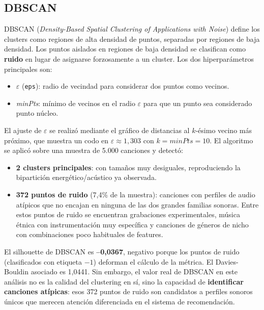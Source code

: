 \documentclass[12pt, a4paper]{book}
\theoremstyle{definition}
\begin{document}
\subsection{DBSCAN}
\label{sec:dbscan}

DBSCAN (\textit{Density-Based Spatial Clustering of Applications with Noise})
define los clusters como regiones de alta densidad de puntos, separadas por
regiones de baja densidad. Los puntos aislados en regiones de baja densidad
se clasifican como \textbf{ruido} en lugar de asignarse forzosamente a un
cluster. Los dos hiperparámetros principales son:

\begin{itemize}
  \item $\varepsilon$ (\texttt{eps}): radio de vecindad para considerar dos
        puntos como vecinos.
  \item \textit{minPts}: mínimo de vecinos en el radio $\varepsilon$ para
        que un punto sea considerado punto núcleo.
\end{itemize}

El ajuste de $\varepsilon$ se realizó mediante el gráfico de distancias al
$k$-ésimo vecino más próximo, que muestra un codo en $\varepsilon \approx 1{,}303$
con $k = \textit{minPts} = 10$. El algoritmo se aplicó sobre una muestra de
5.000 canciones y detectó:
\begin{itemize}
  \item \textbf{2 clusters principales}: con tamaños muy desiguales,
        reproduciendo la bipartición energético/acústico ya observada.
  \item \textbf{372 puntos de ruido} (7{,}4\% de la muestra): canciones con
        perfiles de audio atípicos que no encajan en ninguna de las dos
        grandes familias sonoras. Entre estos puntos de ruido se encuentran
        grabaciones experimentales, música étnica con instrumentación muy
        específica y canciones de géneros de nicho con combinaciones poco
        habituales de features.
\end{itemize}

El silhouette de DBSCAN es \textbf{--0{,}0367}, negativo porque los puntos
de ruido (clasificados con etiqueta $-1$) deforman el cálculo de la métrica.
El Davies-Bouldin asociado es 1{,}0441. Sin embargo, el valor real de DBSCAN
en este análisis no es la calidad del clustering en sí, sino la capacidad de
\textbf{identificar canciones atípicas}: esos 372 puntos de ruido son
candidatos a perfiles sonoros únicos que merecen atención diferenciada en
el sistema de recomendación.
\end{document}

